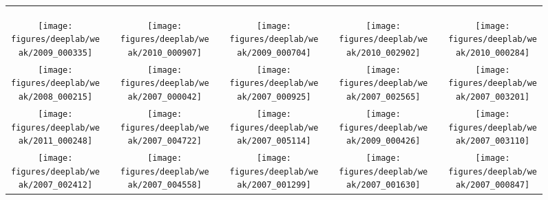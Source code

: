 \documentclass[10pt,english,british,twocolumn]{article}
\providecommand{\tabularnewline}{\\}
\begin{document}
\begin{figure*}[t]
{\begin{tabular}[b]{ccccccccc}
\vspace{0.1em}
 &  &  &  &  &  &  &  & \tabularnewline
\multicolumn{9}{c}{}\tabularnewline
\vspace{1em}
 &  &  &  &  &  &  &  & \tabularnewline
\texttt{[image: figures/deeplab/weak/2009\_000335]} & \hspace*{0.1em} & \texttt{[image: figures/deeplab/weak/2010\_000907]} & \hspace*{0.1em} & \texttt{[image: figures/deeplab/weak/2009\_000704]} & \hspace*{0.1em} & \texttt{[image: figures/deeplab/weak/2010\_002902]} & \hspace*{0.1em} & \texttt{[image: figures/deeplab/weak/2010\_000284]}\tabularnewline
\texttt{[image: figures/deeplab/weak/2008\_000215]} & \hspace*{0.1em} & \texttt{[image: figures/deeplab/weak/2007\_000042]} & \hspace*{0.1em} & \texttt{[image: figures/deeplab/weak/2007\_000925]} & \hspace*{0.1em} & \texttt{[image: figures/deeplab/weak/2007\_002565]} & \hspace*{0.1em} & \texttt{[image: figures/deeplab/weak/2007\_003201]}\tabularnewline
\texttt{[image: figures/deeplab/weak/2011\_000248]} & \hspace*{0.1em} & \texttt{[image: figures/deeplab/weak/2007\_004722]} & \hspace*{0.1em} & \texttt{[image: figures/deeplab/weak/2007\_005114]} & \hspace*{0.1em} & \texttt{[image: figures/deeplab/weak/2009\_000426]} & \hspace*{0.1em} & \texttt{[image: figures/deeplab/weak/2007\_003110]}\tabularnewline
\texttt{[image: figures/deeplab/weak/2007\_002412]} & \hspace*{0.1em} & \texttt{[image: figures/deeplab/weak/2007\_004558]} & \hspace*{0.1em} & \texttt{[image: figures/deeplab/weak/2007\_001299]} & \hspace*{0.1em} & \texttt{[image: figures/deeplab/weak/2007\_001630]} & \hspace*{0.1em} & \texttt{[image: figures/deeplab/weak/2007\_000847]}\tabularnewline

\end{tabular}}
\end{figure*}
\end{document}
